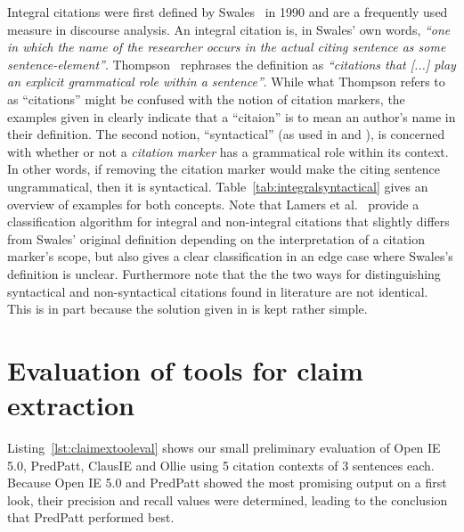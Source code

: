 Integral citations were first defined by Swales~\cite{Swales1990} in 1990 and are a frequently used~\cite{Hyland1999,Thompson2001,Okamura2008,Lamers2018} measure in discourse analysis. An integral citation is, in Swales' own words, \emph{``one in which the name of the researcher occurs in the actual citing sentence as some sentence-element''}. Thompson~\cite{Thompson2001} rephrases the definition as \emph{``citations that [...] play an explicit grammatical role within a sentence''}. While what Thompson refers to as ``citations'' might be confused with the notion of citation markers, the examples given in \cite{Thompson2001} clearly indicate that a ``citaion'' is to mean an author's name in their definition. The second notion, ``syntactical'' (as used in \cite{Whidby2011} and \cite{Abujbara2012}), is concerned with whether or not a \emph{citation marker} has a grammatical role within its context. In other words, if removing the citation marker would make the citing sentence ungrammatical, then it is syntactical. Table~\ref{tab:integralsyntactical} gives an overview of examples for both concepts. Note that Lamers et al.~\cite{Lamers2018} provide a classification algorithm for integral and non-integral citations that slightly differs from Swales' original definition depending on the interpretation of a citation marker's scope, but also gives a clear classification in an edge case where Swales's definition is unclear. Furthermore note that the the two ways for distinguishing syntactical and non-syntactical citations found in literature are not identical. This is in part because the solution given in \cite{Abujbara2012} is kept rather simple.


\chapter{Evaluation of tools for claim extraction}\label{chap:claimextooleval}

Listing~\ref{lst:claimextooleval} shows our small preliminary evaluation of Open IE 5.0, PredPatt, ClausIE and Ollie using 5 citation contexts of 3 sentences each. Because Open IE 5.0 and PredPatt showed the most promising output on a first look, their precision and recall values were determined, leading to the conclusion that PredPatt performed best.



